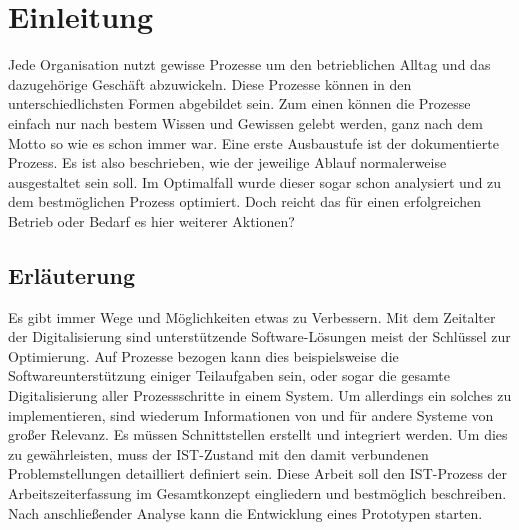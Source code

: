 \documentclass[12pt]{article}
\begin{document}
\maketitle
\thispagestyle{empty}

\newpage
\pagestyle{headings}




\pagestyle{headings}

\newpage
\section*{}
	\tableofcontents
\newpage
{}
\listoffigures
\newpage
{}
\listoftables
{}
\lstlistoflistings

\newpage


\newpage
{}
\setcounter{page}{1}

\section{Einleitung}
Jede Organisation nutzt gewisse Prozesse um den betrieblichen Alltag und das dazugehörige Geschäft abzuwickeln. Diese Prozesse können in den unterschiedlichsten Formen abgebildet sein. Zum einen können die Prozesse einfach nur nach bestem Wissen und Gewissen gelebt werden, ganz nach dem Motto \flqq so wie es schon immer war\frqq. Eine erste Ausbaustufe ist der dokumentierte Prozess. Es ist also beschrieben, wie der jeweilige Ablauf normalerweise ausgestaltet sein soll. Im Optimalfall wurde dieser sogar schon analysiert und zu dem bestmöglichen Prozess optimiert. Doch reicht das für einen erfolgreichen Betrieb oder Bedarf es hier weiterer Aktionen?
\subsection{Erläuterung}
Es gibt immer Wege und Möglichkeiten etwas zu Verbessern. Mit dem Zeitalter der Digitalisierung sind unterstützende Software-Lösungen meist der Schlüssel zur Optimierung. Auf Prozesse bezogen kann dies beispielsweise die Softwareunterstützung einiger Teilaufgaben sein, oder sogar die gesamte Digitalisierung aller Prozessschritte in einem System. Um allerdings ein solches zu implementieren, sind wiederum Informationen von und für andere Systeme von großer Relevanz. Es müssen Schnittstellen erstellt und integriert werden. Um dies zu gewährleisten, muss der IST-Zustand mit den damit verbundenen Problemstellungen detailliert definiert sein. Diese Arbeit soll den IST-Prozess der Arbeitszeiterfassung im Gesamtkonzept eingliedern und bestmöglich beschreiben. Nach anschließender Analyse kann die Entwicklung eines Prototypen starten. 
\end{document}
